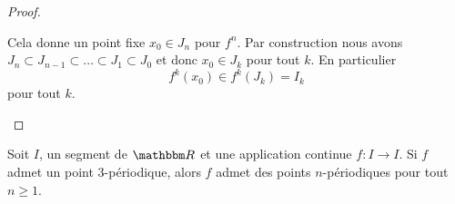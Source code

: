 \begin{proof}
\begin{subproof}
        Cela donne un point fixe \( x_0\in J_n\) pour \( f^n\). Par construction nous avons \( J_n\subset J_{n-1}\subset\ldots\subset J_1\subset J_0\) et donc \( x_0\in J_k\) pour tout \( k\). En  particulier
        \begin{equation}
            f^k(x_0)\in f^k(J_k)=I_k
        \end{equation}
        pour tout \( k\).
    \end{subproof}
\end{proof}

\begin{theorem}
    Soit \( I\), un segment de \( \eR\) et une application continue \( f\colon I\to I\). Si \( f\) admet un point \( 3\)-périodique, alors \( f\) admet des points \( n\)-périodiques pour tout \( n\geq 1\).
\end{theorem}

